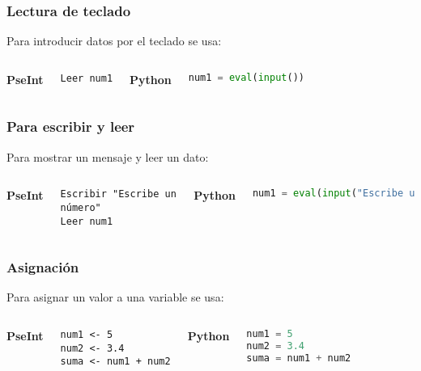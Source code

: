 \begin{frame}[fragile]
  \frametitle{Lectura de teclado}

  Para introducir datos por el teclado se usa:
  \vspace{\baselineskip}
  \begin{columns}
      \textbf{PseInt}
      \begin{lstlisting}[style=pseudocodigo]
Leer num1
      \end{lstlisting}
    \pausa
      \textbf{Python}
      \begin{lstlisting}[language=Python]
num1 = eval(input())
      \end{lstlisting}
  \end{columns}
\end{frame}

\begin{frame}[fragile]
  \frametitle{Para escribir y leer}

  Para mostrar un mensaje y leer un dato:
  \vspace{\baselineskip}
  \begin{columns}
      \textbf{PseInt}
      \begin{lstlisting}[style=pseudocodigo]
Escribir "Escribe un número"
Leer num1
      \end{lstlisting}
    \pausa
      \textbf{Python}
      \begin{lstlisting}[language=Python]
num1 = eval(input("Escribe un número"))
      \end{lstlisting}
  \end{columns}
\end{frame}

\begin{frame}[fragile]
  \frametitle{Asignación}

  Para asignar un valor a una variable se usa:
  \vspace{\baselineskip}
  \begin{columns}
      \textbf{PseInt}
      \begin{lstlisting}[style=pseudocodigo]
num1 <- 5
num2 <- 3.4
suma <- num1 + num2
      \end{lstlisting}
    \pausa
      \textbf{Python}
      \begin{lstlisting}[language=Python]
num1 = 5
num2 = 3.4
suma = num1 + num2
      \end{lstlisting}
  \end{columns}
\end{frame}

